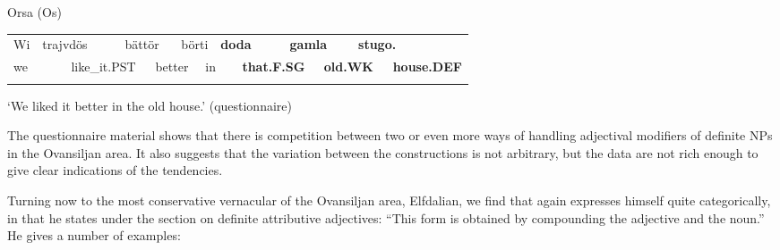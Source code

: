 \begin{listWWNumileveli}
\item 

\begin{styleExample}
Orsa (Os)

\end{styleExample}

\end{listWWNumileveli}

\begin{tabular}{llllllllllllll}
\lsptoprule
Wi & \multicolumn{2}{l}{trajvdös

} & \multicolumn{2}{l}{bättör

} & \multicolumn{2}{l}{börti

} & \multicolumn{2}{l}{{\bfseries doda}

} & \multicolumn{2}{l}{{\bfseries gamla}

} & \multicolumn{2}{l}{{\bfseries stugo.}

} & \\
\multicolumn{2}{l}{we

} & \multicolumn{2}{l}{like\_it.PST

} & \multicolumn{2}{l}{better

} & \multicolumn{2}{l}{in

} & \multicolumn{2}{l}{{\bfseries that.F.SG}

} & \multicolumn{2}{l}{{\bfseries old.WK}

} & \multicolumn{2}{l}{{\bfseries house.DEF}

}\\
\lspbottomrule
\end{tabular}

\begin{styleTranslation}
‘We liked it better in the old house.’ (questionnaire)

\end{styleTranslation}

\begin{styleBodyTextFirst}
The questionnaire material shows that there is competition between two or even more ways of handling adjectival modifiers of definite NPs in the Ovansiljan area. It also suggests that the variation between the constructions is not arbitrary, but the data are not rich enough to give clear indications of the tendencies. 

\end{styleBodyTextFirst}

\begin{styleBodytextC}
Turning now to the most conservative vernacular of the Ovansiljan area, Elfdalian, we find that \citet[53]{Levander1909} again expresses himself quite categorically, in that he states under the section on definite attributive adjectives: “This form is obtained by compounding the adjective and the noun.” He gives a number of examples:

\end{styleBodytextC}

